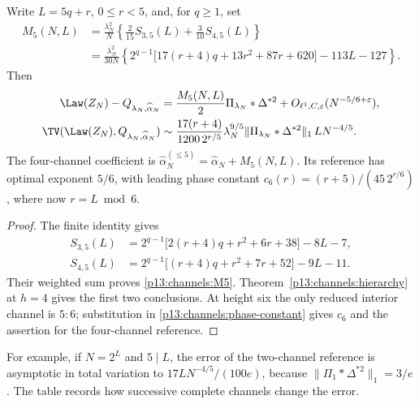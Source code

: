 \begin{corollary}
\label{p13:channels:height-five}
Write $L=5q+r$, $0\leq r<5$, and, for $q\geq1$, set
\begin{equation}
 \begin{split}
 M_5(N,L)&=\frac{\lambda_N^2}{N}
             \left\{\frac2{15}S_{3,5}(L)+\frac3{10}S_{4,5}(L)\right\}\\
 &=\frac{\lambda_N^2}{30N}
   \left\{2^{q-1}\bigl[17(r+4)q+13r^2+87r+620\bigr]
                              -113L-127\right\}.
 \end{split}
 \label{p13:channels:M5}
\end{equation}
Then
\begin{align}
 \Law(Z_N)-Q_{\lambda_N,\widehat\alpha_N}
   &=\frac{M_5(N,L)}2\Pi_{\lambda_N}*\Delta^{*2}
                +O_{\ell^1,C,\varepsilon}(N^{-5/6+\varepsilon}),
                \label{p13:channels:two-channel-law}\\
 \TV(\Law(Z_N),Q_{\lambda_N,\widehat\alpha_N})
   &\sim\frac{17(r+4)}{1200\,2^{r/5}}\lambda_N^{9/5}
       \|\Pi_{\lambda_N}*\Delta^{*2}\|_1\,L N^{-4/5}.
                \label{p13:channels:two-channel-tv}
\end{align}
The four-channel coefficient is
$\widehat\alpha_N^{(\leq5)}=\widehat\alpha_N+M_5(N,L)$.
Its reference has optimal exponent $5/6$, with leading phase constant
$c_6(r)=(r+5)/(45\,2^{r/6})$, where now $r=L\bmod6$.
\end{corollary}

\begin{proof}
The finite identity gives
\begin{align*}
 S_{3,5}(L)&=2^{q-1}\bigl[2(r+4)q+r^2+6r+38\bigr]-8L-7,\\
 S_{4,5}(L)&=2^{q-1}\bigl[(r+4)q+r^2+7r+52\bigr]-9L-11.
\end{align*}
Their weighted sum proves \eqref{p13:channels:M5}.
Theorem~\ref{p13:channels:hierarchy} at $h=4$ gives the first two
conclusions.  At height six the only reduced interior channel is $5:6$;
substitution in \eqref{p13:channels:phase-constant} gives $c_6$ and the
assertion for the four-channel reference.
\end{proof}

For example, if $N=2^L$ and $5\mid L$, the error of the two-channel
reference is asymptotic in total variation to
$17LN^{-4/5}/(100e)$, because
$\|\Pi_1*\Delta^{*2}\|_1=3/e$.
The table records how successive complete channels change the error.

